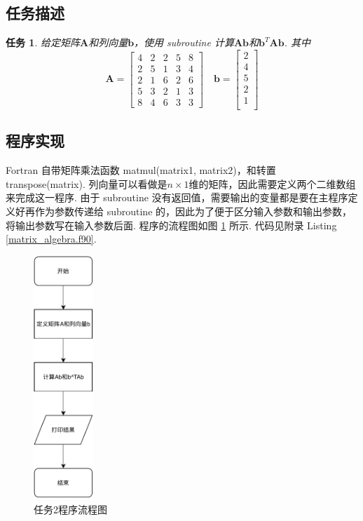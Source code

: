 \documentclass{article}
\newtheorem{task}{任务}
\begin{document}
	\subsection{任务描述}
	\begin{task}
		给定矩阵$\bm{A}$和列向量$\bm{b}$，使用 subroutine 计算$\bm{Ab}$和$\bm{b}^T\bm{A}\bm{b}$. 其中
		\[
		\bm{A} = 
		\begin{bmatrix}
		4 & 2 & 2 & 5 & 8 \\
		2 & 5 & 1 & 3 & 4 \\
		2 & 1 & 6 & 2 & 6 \\
		5 & 3 & 2 & 1 & 3 \\
		8 & 4 & 6 & 3 & 3
		\end{bmatrix}
		\quad
		\bm{b}=
		\begin{bmatrix}
		2 \\
		4 \\
		5 \\
		2 \\
		1 \\
		\end{bmatrix}
		\]
	\end{task}
	\subsection{程序实现}
	Fortran 自带矩阵乘法函数 matmul(matrix1, matrix2)，和转置 transpose(matrix). 列向量可以看做是$n\times1$维的矩阵，因此需要定义两个二维数组来完成这一程序. 由于 subroutine 没有返回值，需要输出的变量都是要在主程序定义好再作为参数传递给 subroutine 的，因此为了便于区分输入参数和输出参数，将输出参数写在输入参数后面. 程序的流程图如图 \ref{fig:matrix_algebra} 所示. 代码见附录 Listing \ref{matrix_algebra.f90}.
	\begin{figure}[h!tb]
		\centering
		\includegraphics[width=0.2\textwidth]{./utils/matrix_algebra.pdf}
		\caption{ 任务2程序流程图\label{fig:matrix_algebra}}
	\end{figure}
\end{document}
